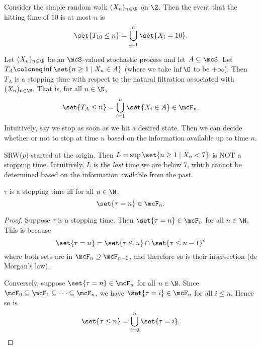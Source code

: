 Consider the simple random walk $(X_n)_{n \in \N}$ on $\Z$.
Then the event that the hitting time of $10$ is at most $n$ is \[
    \set{T_{10} \le n} = \bigcup_{i=1}^{n} \set{X_i = 10}.
\]
\begin{examples}
    \item Let $(X_n)_{n \in \N}$ be an $\mcS$-valued stochastic process and let
    $A \subseteq \mcS$.
    Let $T_A \coloneq \inf\set{n \ge 1 \mid X_n \in A}$ (where we take
    $\inf \O$ to be $+\infty$).
    Then $T_A$ is a stopping time with respect to the natural filtration
    associated with $(X_n)_{n \in \N}$.
    That is, for all $n \in \N$, \[
        \set{T_A \le n} = \bigcup_{i=1}^{n} \set{X_i \in A} \in \F_n.
    \]
    Intuitively, say we stop as soon as we hit a desired state.
    Then we can decide whether or not to stop at time $n$ based on the
    information available up to time $n$.
    \item SRW($p$) started at the origin.
    Then $L = \sup \set{n \ge 1 \mid X_n < 7}$ is NOT a stopping time.
    Intuitively, $L$ is the \emph{last} time we are below $7$, which cannot
    be determined based on the information available from the past.
\end{examples}
\begin{proposition*} \label{thm:stopping_time}
    $\tau$ is a stopping time iff for all $n \in \N$, \[
        \set{\tau = n} \in \F_n.
    \]
\end{proposition*}
\begin{proof}
    Suppose $\tau$ is a stopping time.
    Then $\set{\tau = n} \in \F_n$ for all $n \in \N$.
    This is because \[
        \set{\tau = n} = \set{\tau \le n} \cap \set{\tau \le n-1}^c
    \] where both sets are in $\F_n \supseteq \F_{n-1}$,
    and therefore so is their intersection (de Morgan's law).

    Conversely, suppose $\set{\tau = n} \in \F_n$ for all $n \in \N$.
    Since $\F_0 \subseteq \F_1 \subseteq \dots \subseteq \F_n$, we have
    $\set{\tau = i} \in \F_n$ for all $i \le n$.
    Hence so is \[
        \set{\tau \le n} = \bigcup_{i=0}^{n} \set{\tau = i}. \qedhere
    \]
\end{proof}

